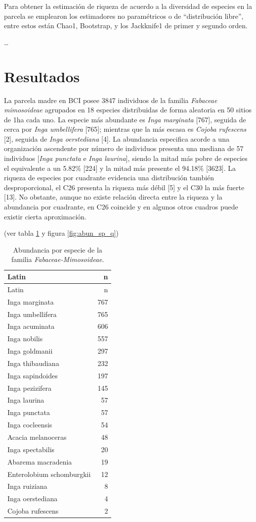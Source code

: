 \documentclass[11pt,]{article}
\begin{document}
Para obtener la estimación de riqueza de acuerdo a la diversidad de
especies en la parcela se emplearon los estimadores no paramétricos o de
``distribución libre'', entre estos están Chao1, Bootstrap, y los
Jackknife1 de primer y segundo orden.

\ldots

\section{Resultados}\label{resultados}

La parcela madre en BCI posee 3847 individuos de la familia
\emph{Fabaceae mimosoideae} agrupados en 18 especies distribuidas de
forma aleatoria en 50 sitios de 1ha cada uno. La especie más abundante
es \emph{Inga marginata} {[}767{]}, seguida de cerca por \emph{Inga
umbellifera} {[}765{]}; mientras que la más escasa es \emph{Cojoba
rufescens} {[}2{]}, seguida de \emph{Inga oerstediana} {[}4{]}. La
abundancia especifica acorde a una organización ascendente por número de
individuos presenta una mediana de 57 individuos {[}\emph{Inga punctata}
e \emph{Inga laurina}{]}, siendo la mitad más pobre de especies el
equivalente a un 5.82\% {[}224{]} y la mitad más presente el 94.18\%
{[}3623{]}. La riqueza de especies por cuadrante evidencia una
distribución también desproporcional, el C26 presenta la riqueza más
débil {[}5{]} y el C30 la más fuerte {[}13{]}. No obstante, aunque no
existe relación directa entre la riqueza y la abundancia por cuadrante,
en C26 coincide y en algunos otros cuadros puede existir cierta
aproximación.

(ver tabla \ref{tab:abun_sp} y figura \ref{fig:abun_sp_q})

\begin{longtable}[]{@{}lr@{}}
\caption{\label{tab:abun_sp}Abundancia por especie de la familia
\emph{Fabaceae-Mimosoideae}.}\tabularnewline
\toprule
Latin & n\tabularnewline
\midrule
\endfirsthead
\toprule
Latin & n\tabularnewline
\midrule
\endhead
Inga marginata & 767\tabularnewline
Inga umbellifera & 765\tabularnewline
Inga acuminata & 606\tabularnewline
Inga nobilis & 557\tabularnewline
Inga goldmanii & 297\tabularnewline
Inga thibaudiana & 232\tabularnewline
Inga sapindoides & 197\tabularnewline
Inga pezizifera & 145\tabularnewline
Inga laurina & 57\tabularnewline
Inga punctata & 57\tabularnewline
Inga cocleensis & 54\tabularnewline
Acacia melanoceras & 48\tabularnewline
Inga spectabilis & 20\tabularnewline
Abarema macradenia & 19\tabularnewline
Enterolobium schomburgkii & 12\tabularnewline
Inga ruiziana & 8\tabularnewline
Inga oerstediana & 4\tabularnewline
Cojoba rufescens & 2\tabularnewline
\bottomrule
\end{longtable}
\end{document}
